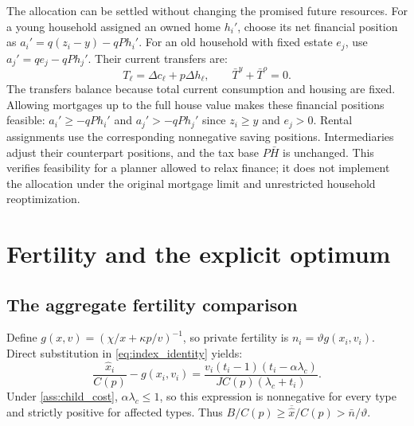 \documentclass[11pt]{article}
\newcommand{\avg}[1]{\overline{#1}}
\begin{document}
The allocation can be settled without changing the promised future resources.
For a young household assigned an owned home $h_i'$, choose its net financial
position as $a_i'=q(z_i-y)-qPh_i'$. For an old household with fixed estate
$e_j$, use $a_j'=qe_j-qPh_j'$. Their current transfers are:
\begin{equation}
T_\ell=\Delta c_\ell+p\Delta h_\ell,\qquad
\bar T^y+\bar T^o=0.
\end{equation}
The transfers balance because total current consumption and housing are fixed.
Allowing mortgages up to the full house value makes these financial positions
feasible: $a_i'\ge-qPh_i'$ and $a_j'>-qPh_j'$ since $z_i\ge y$ and
$e_j>0$. Rental assignments use the corresponding nonnegative saving
positions. Intermediaries adjust their counterpart positions, and the tax
base $P\bar H$ is unchanged. This verifies feasibility for a planner allowed
to relax finance; it does not implement the allocation under the original
mortgage limit and unrestricted household reoptimization.

\section{Fertility and the explicit optimum}\label{app:fertility}

\subsection{The aggregate fertility comparison}

Define $g(x,v)=(\chi/x+\kappa p/v)^{-1}$, so private fertility is
$n_i=\vartheta g(x_i,v_i)$. Direct substitution in
\eqref{eq:index_identity} yields:
\begin{equation}
\frac{\widehat x_i}{C(p)}-g(x_i,v_i)
 =\frac{v_i(t_i-1)(t_i-\alpha\lambda_c)}
 {JC(p)(\lambda_c+t_i)}.
\label{eq:fertility_index}
\end{equation}
Under \eqref{ass:child_cost}, $\alpha\lambda_c\le1$, so this expression
is nonnegative for every type and strictly positive for affected types.
Thus $B/C(p)\ge\avg{\widehat x}/C(p)>\bar n/\vartheta$.
\end{document}
